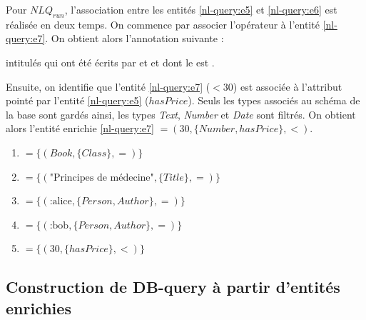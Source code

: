 \begin{example}
    \label{ex:nl-query:enrichEnts}
    Pour $NLQ_{run}$, l'association entre les entités \ref{nl-query:e5}  et \ref{nl-query:e6}  est réalisée en deux temps.
    On commence par associer l'opérateur  à l'entité \ref{nl-query:e7}.
    On obtient alors l'annotation suivante :
    \begin{displayquote}
         intitulés  qui ont été écrits par  et  et dont le  est .
    \end{displayquote}
    Ensuite, on identifie que l'entité \ref{nl-query:e7} ($<30$) est associée à l'attribut pointé par l'entité \ref{nl-query:e5} ($hasPrice$).
    Seuls les types associés au schéma de la base sont gardés ainsi, les types \emph{Text}, \emph{Number} et \emph{Date} sont filtrés.
    On obtient alors l'entité enrichie \ref{nl-query:e7} $= (30, \{Number, hasPrice\}, <)$.
    \begin{multicols}{2}
        \begin{enumerate}[label=$E_{e\arabic*}$]
            \item \label{nl-query:ee1} $= \{(Book, \{Class\}, =)\}$
            \item \label{nl-query:ee2} $= \{(\text{"Principes de médecine"}, \{Title\}, =)\}$
            \item \label{nl-query:ee3} $= \{(\text{:alice}, \{Person, Author\}, =)\}$
            \item \label{nl-query:ee4} $= \{(\text{:bob}, \{Person, Author\}, =)\}$
            \item \label{nl-query:ee5} $= \{(30, \{hasPrice\}, <)\}$
        \end{enumerate}
    \end{multicols}
\end{example}

\subsection{Construction de DB-query à partir d'entités enrichies}


